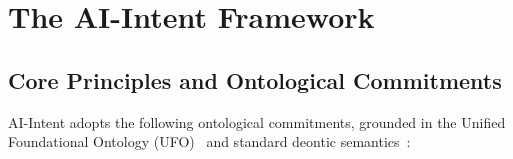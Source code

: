 \documentclass[runningheads]{llncs}
\begin{document}
\section{The AI-Intent Framework}
\label{sec:framework}

\subsection{Core Principles and Ontological Commitments}
\label{sec:ontology}

AI-Intent adopts the following ontological commitments, grounded in
the Unified Foundational Ontology (UFO)~\cite{guizzardi2005ontological}
and standard deontic
semantics~\cite{vonwright1951essay,governatori2005meeting}:
\end{document}
